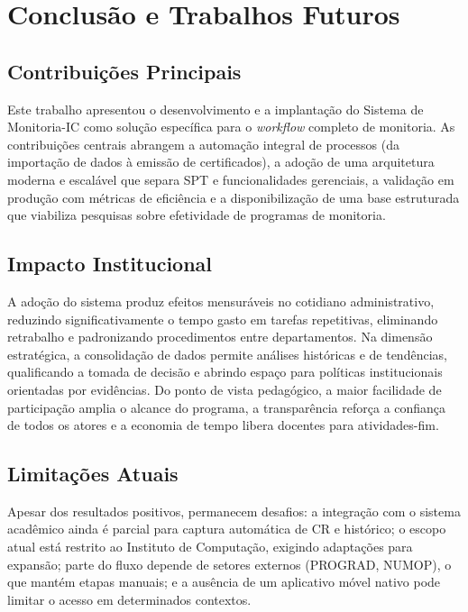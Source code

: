 \documentclass[portuguese]{sbc2025}%
\begin{document}
\section{Conclusão e Trabalhos Futuros}
\label{sec:conclusion}

\subsection{Contribuições Principais}

Este trabalho apresentou o desenvolvimento e a implantação do Sistema de Monitoria-IC como solução específica para o \textit{workflow} completo de monitoria. As contribuições centrais abrangem a automação integral de processos (da importação de dados à emissão de certificados), a adoção de uma arquitetura moderna e escalável que separa SPT e funcionalidades gerenciais, a validação em produção com métricas de eficiência e a disponibilização de uma base estruturada que viabiliza pesquisas sobre efetividade de programas de monitoria.

\subsection{Impacto Institucional}

A adoção do sistema produz efeitos mensuráveis no cotidiano administrativo, reduzindo significativamente o tempo gasto em tarefas repetitivas, eliminando retrabalho e padronizando procedimentos entre departamentos. Na dimensão estratégica, a consolidação de dados permite análises históricas e de tendências, qualificando a tomada de decisão e abrindo espaço para políticas institucionais orientadas por evidências. Do ponto de vista pedagógico, a maior facilidade de participação amplia o alcance do programa, a transparência reforça a confiança de todos os atores e a economia de tempo libera docentes para atividades-fim.

\subsection{Limitações Atuais}

Apesar dos resultados positivos, permanecem desafios: a integração com o sistema acadêmico ainda é parcial para captura automática de CR e histórico; o escopo atual está restrito ao Instituto de Computação, exigindo adaptações para expansão; parte do fluxo depende de setores externos (PROGRAD, NUMOP), o que mantém etapas manuais; e a ausência de um aplicativo móvel nativo pode limitar o acesso em determinados contextos.
\end{document}
